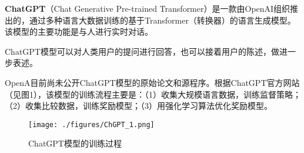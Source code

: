 
\textbf{ChatGPT}（Chat Generative Pre-trained Transformer）是一款由OpenAI组织推出的，通过多种语言大数据训练的基于Transformer（转换器）的语言生成模型。该模型的主要功能是与人进行实时对话。

ChatGPT模型可以对人类用户的提问进行回答，也可以接着用户的陈述，做进一步表述。

OpenA目前尚未公开ChatGPT模型的原始论文和源程序。根据ChatGPT官方网站（见图1），该模型的训练流程主要是：（1）收集大规模语言数据，训练监督策略；（2）收集比较数据，训练奖励模型；（3）用强化学习算法优化奖励模型。
\begin{figure}[ht]
\centering
\texttt{[image: ./figures/ChGPT\_1.png]}
\caption{ChatGPT模型的训练过程} \label{ChGPT_fig1}
\end{figure}
